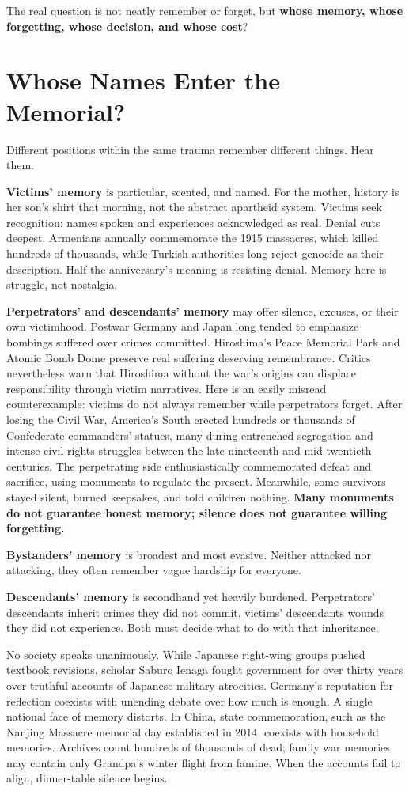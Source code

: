 The real question is not neatly remember or forget, but \textbf{whose memory, whose forgetting, whose decision, and whose cost}?

\section{Whose Names Enter the Memorial?}
Different positions within the same trauma remember different things. Hear them.

\textbf{Victims' memory} is particular, scented, and named. For the mother, history is her son's shirt that morning, not the abstract apartheid system. Victims seek recognition: names spoken and experiences acknowledged as real. Denial cuts deepest. Armenians annually commemorate the 1915 massacres, which killed hundreds of thousands, while Turkish authorities long reject genocide as their description. Half the anniversary's meaning is resisting denial. Memory here is struggle, not nostalgia.

\textbf{Perpetrators' and descendants' memory} may offer silence, excuses, or their own victimhood. Postwar Germany and Japan long tended to emphasize bombings suffered over crimes committed. Hiroshima's Peace Memorial Park and Atomic Bomb Dome preserve real suffering deserving remembrance. Critics nevertheless warn that Hiroshima without the war's origins can displace responsibility through victim narratives. Here is an easily misread counterexample: victims do not always remember while perpetrators forget. After losing the Civil War, America's South erected hundreds or thousands of Confederate commanders' statues, many during entrenched segregation and intense civil-rights struggles between the late nineteenth and mid-twentieth centuries. The perpetrating side enthusiastically commemorated defeat and sacrifice, using monuments to regulate the present. Meanwhile, some survivors stayed silent, burned keepsakes, and told children nothing. \textbf{Many monuments do not guarantee honest memory; silence does not guarantee willing forgetting.}

\textbf{Bystanders' memory} is broadest and most evasive. Neither attacked nor attacking, they often remember vague hardship for everyone.

\textbf{Descendants' memory} is secondhand yet heavily burdened. Perpetrators' descendants inherit crimes they did not commit, victims' descendants wounds they did not experience. Both must decide what to do with that inheritance.

No society speaks unanimously. While Japanese right-wing groups pushed textbook revisions, scholar Saburo Ienaga fought government for over thirty years over truthful accounts of Japanese military atrocities. Germany's reputation for reflection coexists with unending debate over how much is enough. A single national face of memory distorts. In China, state commemoration, such as the Nanjing Massacre memorial day established in 2014, coexists with household memories. Archives count hundreds of thousands of dead; family war memories may contain only Grandpa's winter flight from famine. When the accounts fail to align, dinner-table silence begins.

